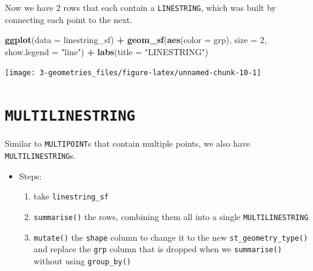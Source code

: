\documentclass[
]{report}
\newenvironment{Shaded}{\begin{snugshade}}{\end{snugshade}}
\newcommand{\DataTypeTok}[1]{\textcolor[rgb]{0.13,0.29,0.53}{#1}}
\newcommand{\DecValTok}[1]{\textcolor[rgb]{0.00,0.00,0.81}{#1}}
\newcommand{\KeywordTok}[1]{\textcolor[rgb]{0.13,0.29,0.53}{\textbf{#1}}}
\newcommand{\NormalTok}[1]{#1}
\newcommand{\OperatorTok}[1]{\textcolor[rgb]{0.81,0.36,0.00}{\textbf{#1}}}
\newcommand{\StringTok}[1]{\textcolor[rgb]{0.31,0.60,0.02}{#1}}
\providecommand{\tightlist}{%
  \setlength{\itemsep}{0pt}\setlength{\parskip}{0pt}}
\begin{document}
Now we have 2 rows that each contain a \texttt{LINESTRING}, which was built by connecting each point to the next.

\begin{Shaded}
\begin{Highlighting}[]
\KeywordTok{ggplot}\NormalTok{(}\DataTypeTok{data =}\NormalTok{ linestring\_sf) }\OperatorTok{+}\StringTok{ }
\StringTok{  }\KeywordTok{geom\_sf}\NormalTok{(}\KeywordTok{aes}\NormalTok{(}\DataTypeTok{color =}\NormalTok{ grp), }\DataTypeTok{size =} \DecValTok{2}\NormalTok{, }\DataTypeTok{show.legend =} \StringTok{"line"}\NormalTok{) }\OperatorTok{+}
\StringTok{  }\KeywordTok{labs}\NormalTok{(}\DataTypeTok{title =} \StringTok{"LINESTRING"}\NormalTok{)}
\end{Highlighting}
\end{Shaded}

\begin{center}\texttt{[image: 3-geometries\_files/figure-latex/unnamed-chunk-10-1]} \end{center}

\hypertarget{multilinestring}{%
\section{\texorpdfstring{\texttt{MULTILINESTRING}}{MULTILINESTRING}}\label{multilinestring}}

Similar to \texttt{MULTIPOINT}s that contain multiple points, we also have \texttt{MULTILINESTRING}s.

\begin{itemize}
\tightlist
\item
  Steps:

  \begin{enumerate}
  \def\labelenumi{\arabic{enumi}.}
  \tightlist
  \item
    take \texttt{linestring\_sf}
  \item
    \texttt{summarise()} the rows, combining them all into a single \texttt{MULTILINESTRING}
  \item
    \texttt{mutate()} the \texttt{shape} column to change it to the new \texttt{st\_geometry\_type()} and replace the \texttt{grp} column that is dropped when we \texttt{summarise()} without using \texttt{group\_by()}
  \end{enumerate}
\end{itemize}
\end{document}
